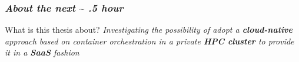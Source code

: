 \begin{frame}
  \frametitle{ \textit{About the next }\sim \textit{  .5 hour}}
  \begin{block}{ What is this thesis about?}
    \textit{
      Investigating the possibility of adopt a \alert{\textbf{cloud-native}} approach based on
      container orchestration in a private \alert{\textbf{HPC cluster}} to provide it in a \textbf{SaaS}
      fashion
%
    }
  \end{block}
\end{frame}


